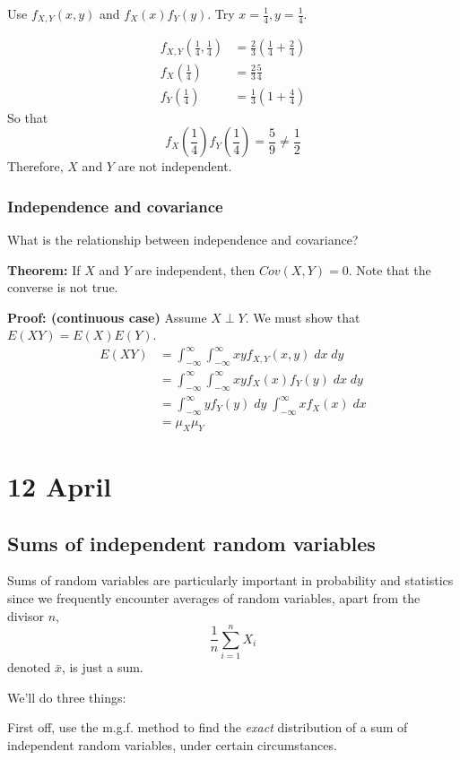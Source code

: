 \documentclass[12pt]{article}
\begin{document}
Use $f_{X,Y} (x,y)$ and $f_X (x) f_Y (y)$. Try $x = \frac{1}{4}, y = \frac{1}{4}$.

\begin{align*}
    f_{X,Y} (\frac{1}{4}, \frac{1}{4}) &= \frac{2}{3} (\frac{1}{4} + \frac{2}{4}) \\
    f_X (\frac{1}{4}) &= \frac{2}{3} \frac{5}{4} \\
    f_Y (\frac{1}{4}) &= \frac{1}{3} (1 + \frac{4}{4})
\end{align*}
So that
\[
    f_X (\frac{1}{4}) f_Y (\frac{1}{4}) = \frac{5}{9} \neq \frac{1}{2}
\]
Therefore, $X$ and $Y$ are not independent. 

\subsubsection{Independence and covariance}
What is the relationship between independence and covariance?

\textbf{Theorem:} If $X$ and $Y$ are independent, then $Cov(X,Y) = 0$. Note that the converse is not true.

\textbf{Proof: (continuous case)} Assume $X \perp Y$. We must show that $E(XY) = E(X)E(Y)$.
\begin{align*}
    E(XY) &= \int_{-\infty}^{\infty} \int_{-\infty}^{\infty} x y f_{X,Y} (x,y) \; dx \; dy \\
         &= \int_{-\infty}^{\infty} \int_{-\infty}^{\infty} x y f_X (x) f_Y (y) \; dx \; dy \\
         &= \int_{-\infty}^{\infty} y f_Y (y) \; dy \; \int_{-\infty}^{\infty} x f_X (x) \; dx \\
         &= \mu_X \mu_Y 
\end{align*}

\section{12 April}
\subsection{Sums of independent random variables}
Sums of random variables are particularly important in probability and statistics since we frequently encounter averages of random variables, apart from the divisor $n$, 
\[
    \frac{1}{n} \sum_{i = 1}^n X_i
\]
denoted $\bar{x}$, is just a sum.

We'll do three things:

First off, use the m.g.f. method to find the \emph{exact} distribution of a sum of independent random variables, under certain circumstances. 
\end{document}
